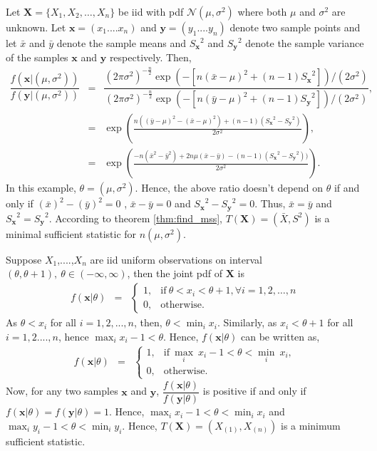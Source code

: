 \documentclass[a4paper,english,12pt]{article}
\newcommand{\bx}{\mathbf{x}}
\newcommand{\by}{\mathbf{y}}
\newcommand{\bX}{\mathbf{X}}
\begin{document}
\begin{exmp}
Let $\bX=\{X_1,X_2,\dots,X_n\}$ be iid with pdf $\mathcal{N}(\mu,\sigma^2)$ where both $\mu$ and $\sigma^2$ are unknown. Let $\bx=(x_1....x_n)$ and $\by=(y_1....y_n)$ denote two sample points and let $\bar{x}$ and $\bar{y}$ denote the sample means and ${S_\bx}^2$ and ${S_\by}^2$ denote the sample variance of the samples $\bx$ and $\by$ respectively. Then,
\begin{eqnarray}
\dfrac{f(\bx|(\mu,\sigma^2))}{f(\by|(\mu,\sigma^2))} &=& \dfrac{(2\pi\sigma^2)^{-\tfrac{n}{2}}\exp(-[n(\bar{x}-\mu)^2 + (n-1){S_{\bx}}^2])/(2\sigma^2)}{(2\pi\sigma^2)^{-\tfrac{n}{2}}\exp(-[n(\bar{y}-\mu)^2 + (n-1){S_{\by}}^2])/(2\sigma^2)},\\
&=&\exp\left(\frac{n((\bar{y}-\mu)^2-(\bar{x}-\mu)^2)+(n-1)({S_{\bx}}^2-{S_{\by}}^2)}{2\sigma^2}\right),\\
&=&\exp\left(\frac{-n(\bar{x}^2-\bar{y}^2)+2n\mu(\bar{x}-\bar{y})-(n-1)({S_{\bx}}^2-{S_{\by}}^2))}{2\sigma^2}\right).
\end{eqnarray}
In this example, $\theta = (\mu,\sigma^2)$. Hence, the above ratio doesn't depend on $\theta$ if and only if $(\bar{x})^2 - (\bar{y})^2 = 0$ , $\bar{x} - \bar{y} = 0$ and ${S_{\bx}}^2-{S_{\by}}^2 = 0$. Thus, $\bar{x} = \bar{y}$ and ${S_{\bx}}^2 = {S_{\by}}^2$. According to theorem \ref{thm:find_mss}, $T(\bX) = (\bar{X},S^2)$ is a minimal sufficient statistic for $n(\mu,\sigma^2)$.
\end{exmp}
\begin{exmp}
Suppose $X_1$,....,$X_n$ are iid uniform observations on interval $(\theta,\theta+1), ~\theta\in(-\infty,\infty)$, then the joint pdf of $\bX$ is
\begin{eqnarray}
f(\bx|\theta) &=&
\begin{cases}
1, &\mbox{if}~ \theta<x_i<\theta+1,\forall i=1,2,\dots,n\\
0, &\mbox{otherwise}.
\end{cases}
\end{eqnarray}
As $\theta<x_i$ for all $i=1,2,...,n$, then, $\theta<\displaystyle\min_i x_i$. Similarly, as $x_i<\theta+1$ for all $i=1,2....,n$, hence $\displaystyle\max_i x_i - 1 < \theta$. Hence, $f(\bx|\theta)$ can be written as,
\begin{eqnarray}
f(\bx|\theta) &=&
\begin{cases}
1, &\mbox{if}~\displaystyle\max_i~ x_i - 1 < \theta < \displaystyle\min_i~x_i,\\
0, &\mbox{otherwise}.
\end{cases}
\end{eqnarray}
Now, for any two samples $\bx$ and $\by$, $\dfrac{f(\bx|\theta)}{f(\by|\theta)}$ is positive if and only if $f(\bx|\theta) = f(\by|\theta) = 1 $. Hence, $\displaystyle\max_i x_i - 1 < \theta < \displaystyle\min_i x_i$ and $\displaystyle\max_i y_i - 1 < \theta < \displaystyle\min_i y_i$.
Hence, $T(\bX)=(X_{(1)},X_{(n)})$ is a minimum sufficient statistic.
\end{exmp}
\end{document}

